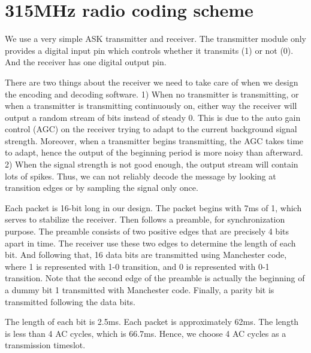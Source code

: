 \appendix \chapter{315MHz radio coding scheme}\label{app1}

We use a very simple ASK transmitter and receiver. The transmitter module only provides a digital input pin which controls whether it transmits (1) or not (0). And the receiver has one digital output pin.
 
There are two things about the receiver we need to take care of when we design the encoding and decoding software. 1) When no transmitter is transmitting, or when a transmitter is transmitting continuously on, either way the receiver will output a random stream of bits instead of steady 0. This is due to the auto gain control (AGC) on the receiver trying to adapt to the current background signal strength. Moreover, when a transmitter begins transmitting, the AGC takes time to adapt, hence the output of the beginning period is more noisy than afterward. 2) When the signal strength is not good enough, the output stream will contain lots of spikes. Thus, we can not reliably decode the message by looking at transition edges or by sampling the signal only once. 

Each packet is 16-bit long in our design. The packet begins with 7ms of 1, which serves to stabilize the receiver. Then follows a preamble, for synchronization purpose. The preamble consists of two positive edges that are precisely 4 bits apart in time. The receiver use these two edges to determine the length of each bit. And following that, 16 data bits are transmitted using Manchester code, where 1 is represented with 1-0 transition, and 0 is represented with 0-1 transition. Note that the second edge of the preamble is actually the beginning of a dummy bit 1 transmitted with Manchester code. Finally, a parity bit is transmitted following the data bits. 

The length of each bit is 2.5ms. Each packet is approximately 62ms. The length is less than 4 AC cycles, which is 66.7ms. Hence, we choose 4 AC cycles as a transmission timeslot. 



